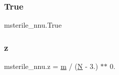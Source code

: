 \subsubsection{\texorpdfstring{True}{True}}
{\footnotesize\ttfamily msterile\+\_\+nnu.\+True}

\mbox{\label{namespacemsterile__nnu_a469ed5d6fc06710bc58b11f46a4639bd}} 
\subsubsection{\texorpdfstring{z}{z}}
{\footnotesize\ttfamily msterile\+\_\+nnu.\+z = \mbox{\hyperlink{namespacemsterile__nnu_ad49be68bece85f98028b3cc37ad2bf49}{m}} / (\mbox{\hyperlink{namespacemsterile__nnu_aa464b65176d2a7b327a61d2e1f1cf531}{N}} -\/ 3.) $\ast$$\ast$ 0.}


